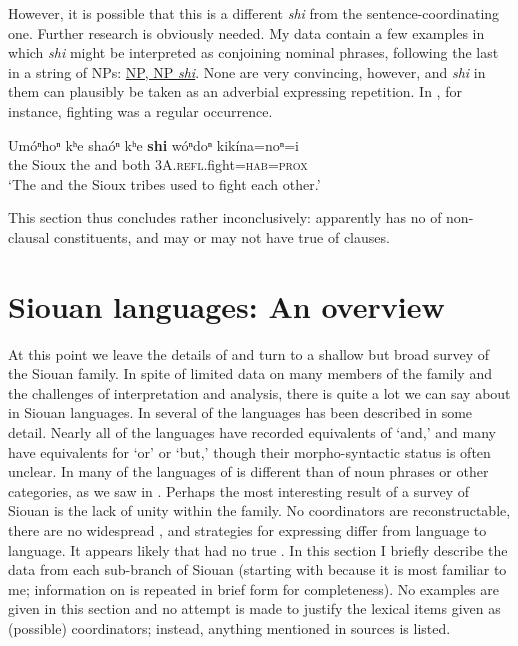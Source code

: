 \documentclass[output=paper]{LSP/langsci}
\begin{document}
However, it is possible that this is a different \textit{shi} from the sentence-coor\-di\-na\-ting one. Further research is obviously needed. My data contain a few examples in which \textit{shi} might be interpreted as conjoining nominal phrases, following the last in a string of NPs:  \uline{NP, NP \textit{shi}}. None are very convincing, however, and \textit{shi} in them can plausibly be taken as an adverbial expressing repetition. In , for instance, fighting was a regular occurrence.

\begin{exe}
\ex\label{ex:rudin:35}
\gll Umóⁿhoⁿ kʰe shaóⁿ kʰe \textbf{shi}  wóⁿdoⁿ 	kikína=noⁿ=i \\
    	the 	Sioux  	the 	and both \textsc{3A}.\textsc{refl}.fight=\textsc{hab}=\textsc{prox} \\
\trans `The  and the Sioux tribes used to fight each other.'    
\end{exe}

This section thus concludes rather inconclusively:  apparently has no  of non-clausal constituents, and may or may not have true  of clauses. 

\section{Siouan languages: An overview}\label{sec:rudin:4}

At this point we leave the details of  and turn to a shallow but broad survey of the Siouan family. In spite of limited data on many members of the family and the challenges of interpretation and analysis, there is quite a lot we can say about  in Siouan languages. In several of the languages  has been described in some detail. Nearly all of the languages have recorded equivalents of `and,' and many have equivalents for `or' or `but,' though their morpho-syntactic status is often unclear. In many of the languages  of  is different than  of noun phrases or other categories, as we saw in . Perhaps the most interesting result of a survey of Siouan  is the lack of unity within the family. No coordinators are reconstructable, there are no widespread , and strategies for expressing  differ from language to language. It appears likely that  had no true . In this section I briefly describe the data from each sub-branch of Siouan (starting with  because it is most familiar to me; information on  is repeated in brief form for completeness). No examples are given in this section and no attempt is made to justify the lexical items given as (possible) coordinators; instead, anything mentioned in sources is listed.
\end{document}

